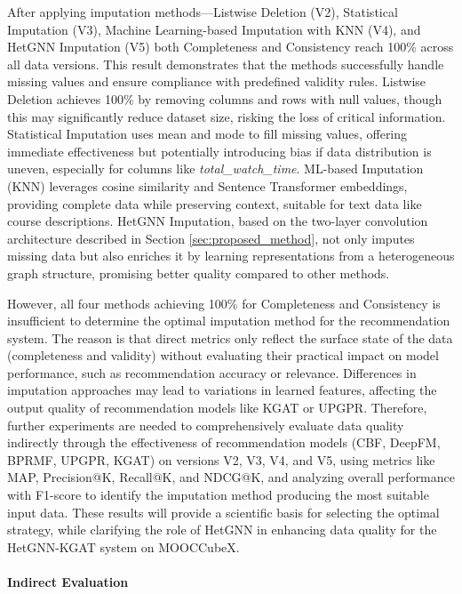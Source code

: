 \documentclass{ieeeaccess}
\begin{document}
After applying imputation methods—Listwise Deletion (V2), Statistical Imputation (V3), Machine Learning-based Imputation with KNN (V4), and HetGNN Imputation (V5) both Completeness and Consistency reach 100\% across all data versions. This result demonstrates that the methods successfully handle missing values and ensure compliance with predefined validity rules. Listwise Deletion achieves 100\% by removing columns and rows with null values, though this may significantly reduce dataset size, risking the loss of critical information. Statistical Imputation uses mean and mode to fill missing values, offering immediate effectiveness but potentially introducing bias if data distribution is uneven, especially for columns like \textit{total\_watch\_time}. ML-based Imputation (KNN) leverages cosine similarity and Sentence Transformer embeddings, providing complete data while preserving context, suitable for text data like course descriptions. HetGNN Imputation, based on the two-layer convolution architecture described in Section \ref{sec:proposed_method}, not only imputes missing data but also enriches it by learning representations from a heterogeneous graph structure, promising better quality compared to other methods.

However, all four methods achieving 100\% for Completeness and Consistency is insufficient to determine the optimal imputation method for the recommendation system. The reason is that direct metrics only reflect the surface state of the data (completeness and validity) without evaluating their practical impact on model performance, such as recommendation accuracy or relevance. Differences in imputation approaches may lead to variations in learned features, affecting the output quality of recommendation models like KGAT or UPGPR.
Therefore, further experiments are needed to comprehensively evaluate data quality indirectly through the effectiveness of recommendation models (CBF, DeepFM, BPRMF, UPGPR, KGAT) on versions V2, V3, V4, and V5, using metrics like MAP, Precision@K, Recall@K, and NDCG@K, and analyzing overall performance with F1-score to identify the imputation method producing the most suitable input data.
These results will provide a scientific basis for selecting the optimal strategy, while clarifying the role of HetGNN in enhancing data quality for the HetGNN-KGAT system on MOOCCubeX.

\paragraph{Indirect Evaluation}
\end{document}
